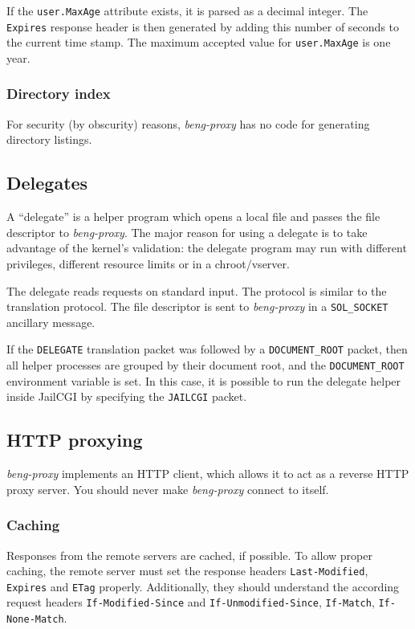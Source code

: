 \documentclass[a4paper,12pt]{article}
\begin{document}
If the \texttt{user.MaxAge} attribute exists, it is parsed as a
decimal integer.  The \texttt{Expires} response header is then
generated by adding this number of seconds to the current time stamp.
The maximum accepted value for \texttt{user.MaxAge} is one year.

\subsubsection{Directory index}

For security (by obscurity) reasons, \emph{beng-proxy} has no code for
generating directory listings.

\subsection{Delegates}
\label{delegate}

A ``delegate'' is a helper program which opens a local file and passes
the file descriptor to \emph{beng-proxy}.  The major reason for using
a delegate is to take advantage of the kernel's validation: the
delegate program may run with different privileges, different resource
limits or in a chroot/vserver.

The delegate reads requests on standard input.  The protocol is
similar to the translation protocol.  The file descriptor is sent to
\emph{beng-proxy} in a \texttt{SOL\_SOCKET} ancillary message.

If the \texttt{DELEGATE} translation packet was followed by a
\texttt{DOCUMENT\_ROOT} packet, then all helper processes are grouped
by their document root, and the \texttt{DOCUMENT\_ROOT} environment
variable is set.  In this case, it is possible to run the delegate
helper inside JailCGI by specifying the \texttt{JAILCGI} packet.

\subsection{HTTP proxying}
\label{http}

\emph{beng-proxy} implements an HTTP client, which allows it to act as
a reverse HTTP proxy server.  You should never make \emph{beng-proxy}
connect to itself.

\subsubsection{Caching}
\label{caching}

Responses from the remote servers are cached, if possible.  To allow
proper caching, the remote server must set the response headers
\texttt{Last-Modified}, \texttt{Expires} and \texttt{ETag} properly.
Additionally, they should understand the according request headers
\texttt{If-Modified-Since} and \texttt{If-Unmodified-Since},
\texttt{If-Match}, \texttt{If-None-Match}.
\end{document}
